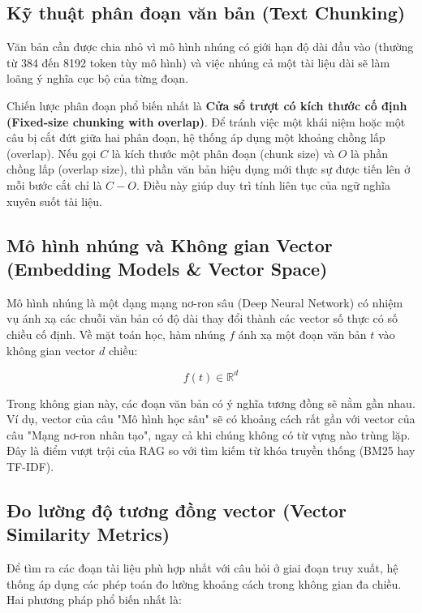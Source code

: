 \subsection{Kỹ thuật phân đoạn văn bản (Text Chunking)}
Văn bản cần được chia nhỏ vì mô hình nhúng có giới hạn độ dài đầu vào (thường từ 384 đến 8192 token tùy mô hình) và việc nhúng cả một tài liệu dài sẽ làm loãng ý nghĩa cục bộ của từng đoạn.

Chiến lược phân đoạn phổ biến nhất là \textbf{Cửa sổ trượt có kích thước cố định (Fixed-size chunking with overlap)}. Để tránh việc một khái niệm hoặc một câu bị cắt đứt giữa hai phân đoạn, hệ thống áp dụng một khoảng chồng lấp (overlap). Nếu gọi $C$ là kích thước một phân đoạn (chunk size) và $O$ là phần chồng lấp (overlap size), thì phần văn bản hiệu dụng mới thực sự được tiến lên ở mỗi bước cắt chỉ là $C-O$. Điều này giúp duy trì tính liên tục của ngữ nghĩa xuyên suốt tài liệu.

\subsection{Mô hình nhúng và Không gian Vector (Embedding Models \& Vector Space)}
Mô hình nhúng là một dạng mạng nơ-ron sâu (Deep Neural Network) có nhiệm vụ ánh xạ các chuỗi văn bản có độ dài thay đổi thành các vector số thực có số chiều cố định. Về mặt toán học, hàm nhúng $f$ ánh xạ một đoạn văn bản $t$ vào không gian vector $d$ chiều:

$$f(t) \in \mathbb{R}^d$$

Trong không gian này, các đoạn văn bản có ý nghĩa tương đồng sẽ nằm gần nhau. Ví dụ, vector của câu "Mô hình học sâu" sẽ có khoảng cách rất gần với vector của câu "Mạng nơ-ron nhân tạo", ngay cả khi chúng không có từ vựng nào trùng lặp. Đây là điểm vượt trội của RAG so với tìm kiếm từ khóa truyền thống (BM25 hay TF-IDF).

\subsection{Đo lường độ tương đồng vector (Vector Similarity Metrics)}
Để tìm ra các đoạn tài liệu phù hợp nhất với câu hỏi ở giai đoạn truy xuất, hệ thống áp dụng các phép toán đo lường khoảng cách trong không gian đa chiều. Hai phương pháp phổ biến nhất là:

